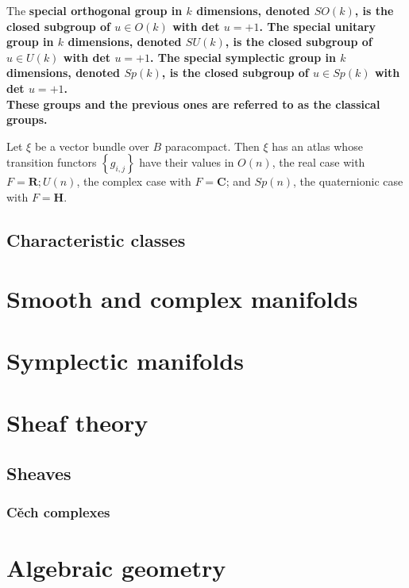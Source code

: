 The \bf{special orthogonal group} in $k$ dimensions, denoted $S O(k)$, is the closed subgroup of $u \in O(k)$ with det $u=+1$. The \bf{special unitary group} in $k$ dimensions, denoted $S U(k)$, is the closed subgroup of $u \in U(k)$ with det $u=+1$. The \bf{special symplectic group} in $k$ dimensions, denoted $S p(k)$, is the closed subgroup of $u \in S p(k)$ with det $u=+1$.\\
These groups and the previous ones are referred to as the \bf{classical groups.}

\begin{theo}
    Let $\xi$ be a vector bundle over $B$ paracompact. Then $\xi$ has an atlas whose transition functors $\left\{g_{i, j}\right\}$ have their values in $O(n)$, the real case with $F=\mathbf{R} ; U(n)$, the complex case with $F=\mathbf{C}$; and $S p(n)$, the quaternionic case with $F=\mathbf{H}$.   
\end{theo}


\section{Characteristic classes}














\chapter{Smooth and complex manifolds}



\chapter{Symplectic manifolds}

\chapter{Sheaf theory}

\section{Sheaves}

\subsection{Cěch complexes}



\chapter{Algebraic geometry}


